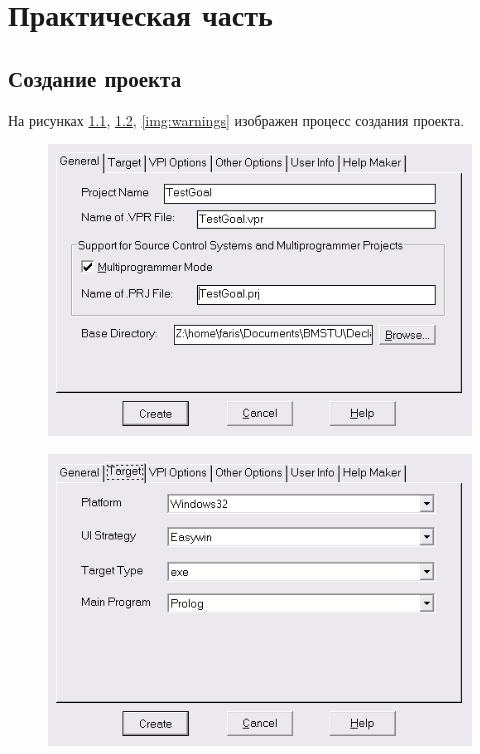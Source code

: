 \chapter{Практическая часть}

\lstset{language=prolog}

\section{Создание проекта}
На рисунках \ref{img:general}, \ref{img:target}, \ref{img:warnings} изображен процесс создания проекта.
\begin{figure}[H]
    \centering
    \includegraphics[scale=.7]{imgs/general.png}
    \caption{}
    \label{img:general}
\end{figure}
\begin{figure}[H]
    \centering
    \includegraphics[scale=.7]{imgs/target.png}
    \caption{}
    \label{img:target}
\end{figure}
